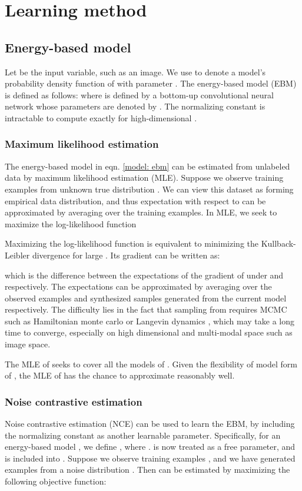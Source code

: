 \documentclass[10pt,twocolumn,letterpaper]{article}
\begin{document}
\section{Learning method}


\subsection{Energy-based model}
\label{sect: ebm}
Let  be the input variable, such as an image. We use  to denote a model's probability density function of  with parameter . The energy-based model (EBM) is defined as follows:
where  is defined by a bottom-up convolutional neural network whose parameters are denoted by . The normalizing constant  is intractable to compute exactly for high-dimensional .

\subsubsection{Maximum likelihood estimation}
The energy-based model in eqn. \ref{model: ebm} can be estimated from unlabeled data by maximum likelihood estimation (MLE). Suppose we observe training examples  from unknown true distribution . We can view this dataset as forming empirical data distribution, and thus expectation with respect to  can be approximated by averaging over the training examples. In MLE, we seek to maximize the log-likelihood function

Maximizing the log-likelihood function is equivalent to minimizing the Kullback-Leibler divergence  for large . Its gradient can be written as:

which is the difference between the expectations of the gradient of  under  and  respectively. The expectations can be approximated by averaging over the observed examples and synthesized samples generated from the current model  respectively. The difficulty lies in the fact that sampling from  requires MCMC such as Hamiltonian monte carlo or Langevin dynamics \cite{girolami2011riemann, zhu1998grade}, which may take a long time to converge, especially on high dimensional and multi-modal space such as image space. 


The MLE of  seeks to cover all the models of . Given the flexibility of model form of , the MLE of  has the chance to approximate  reasonably well. 

\subsubsection{Noise contrastive estimation}
\label{section: nce}
Noise contrastive estimation (NCE) \cite{gutmann2010noise} can be used to learn the EBM, by including the normalizing constant as another learnable parameter. Specifically, for an energy-based model , we define , where .  is now treated as a free parameter, and is included into . Suppose we observe training examples  , and we have generated examples  from a noise distribution . Then  can be estimated by maximizing the following objective function: 
\end{document}
